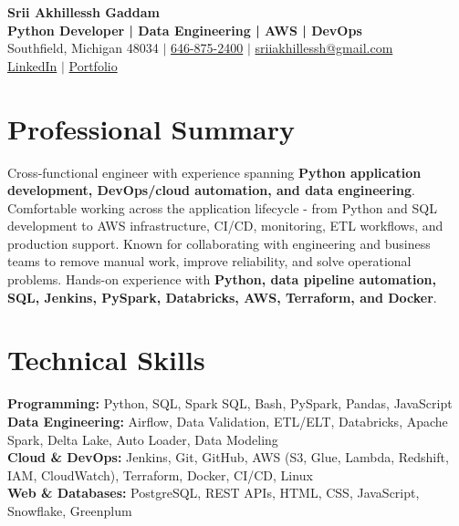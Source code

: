 \documentclass[letterpaper,10pt]{article}
\begin{document}
\fontsize{9.35pt}{10.45pt}\selectfont

\begin{center}
    {\LARGE \textbf{Srii Akhillessh Gaddam}} \\[-1pt]
    \textbf{Python Developer | Data Engineering | AWS | DevOps} \\[2pt]
    Southfield, Michigan 48034 $|$
    \href{tel:6468752400}{646-875-2400} $|$
    \href{mailto:sriiakhillessh@gmail.com}{sriiakhillessh@gmail.com} \\[1pt]
    \href{https://www.linkedin.com/in/srii-akhiilessh-gaddam-b48668191/}{LinkedIn} $|$
    \href{https://sriiakhillesshg.github.io/portfolio/}{Portfolio}
\end{center}
\vspace{-8pt}

\section{Professional Summary}
\small{Cross-functional engineer with experience spanning \textbf{Python application development, DevOps/cloud automation, and data engineering}. Comfortable working across the application lifecycle - from Python and SQL development to AWS infrastructure, CI/CD, monitoring, ETL workflows, and production support. Known for collaborating with engineering and business teams to remove manual work, improve reliability, and solve operational problems. Hands-on experience with \textbf{Python, data pipeline automation, SQL, Jenkins, PySpark, Databricks, AWS, Terraform, and Docker}.}

\section{Technical Skills}
\small{
\textbf{Programming:} Python, SQL, Spark SQL, Bash, PySpark, Pandas, JavaScript \\
\textbf{Data Engineering:} Airflow, Data Validation, ETL/ELT, Databricks, Apache Spark, Delta Lake, Auto Loader, Data Modeling \\
\textbf{Cloud \& DevOps:} Jenkins, Git, GitHub, AWS (S3, Glue, Lambda, Redshift, IAM, CloudWatch), Terraform, Docker, CI/CD, Linux \\
\textbf{Web \& Databases:} PostgreSQL, REST APIs, HTML, CSS, JavaScript, Snowflake, Greenplum
}
\end{document}

